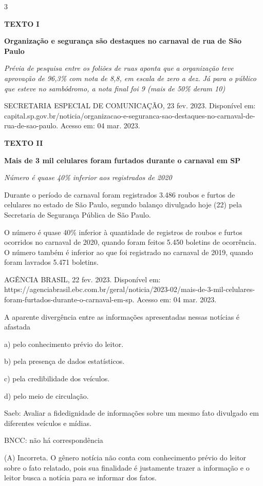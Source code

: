 \num{3}

\textbf{TEXTO I}

\textbf{Organização e segurança são destaques no carnaval de rua de São
Paulo}

\emph{Prévia de pesquisa entre os foliões de ruas aponta que a
organização teve aprovação de 96,3\% com nota de 8,8, em escala de zero
a dez. Já para o público que esteve no sambódromo, a nota final foi 9
(mais de 50\% deram 10)}

SECRETARIA ESPECIAL DE COMUNICAÇÃO, 23 fev. 2023. Disponível em:
capital.sp.gov.br/noticia/organizacao-e-seguranca-sao-destaques-no-carnaval-de-rua-de-sao-paulo.
Acesso em: 04 mar. 2023.

\textbf{TEXTO II}

\textbf{Mais de 3 mil celulares foram furtados durante o carnaval em SP}

\emph{Número é quase 40\% inferior aos registrados de 2020}

Durante o período de carnaval foram registrados 3.486 roubos e furtos de
celulares no estado de São Paulo, segundo balanço divulgado hoje (22)
pela Secretaria de Segurança Pública de São Paulo.

O número é quase 40\% inferior à quantidade de registros de roubos e
furtos ocorridos no carnaval de 2020, quando foram feitos 5.450 boletins
de ocorrência. O número também é inferior ao que foi registrado no
carnaval de 2019, quando foram lavrados 5.471 boletins.

AGÊNCIA BRASIL, 22 fev. 2023. Disponível em:
https://agenciabrasil.ebc.com.br/geral/noticia/2023-02/mais-de-3-mil-celulares-foram-furtados-durante-o-carnaval-em-sp.
Acesso em: 04 mar. 2023.

A aparente divergência entre as informações apresentadas nessas notícias
é afastada

a) pelo conhecimento prévio do leitor.

b) pela presença de dados estatísticos.

c) pela credibilidade dos veículos.

d) pelo meio de circulação.

Saeb: Avaliar a fidedignidade de informações sobre um mesmo fato
divulgado em diferentes veículos e mídias.

BNCC: não há correspondência

(A) Incorreta. O gênero notícia não conta com conhecimento prévio do
leitor sobre o fato relatado, pois sua finalidade é justamente trazer a
informação e o leitor busca a notícia para se informar dos fatos.

